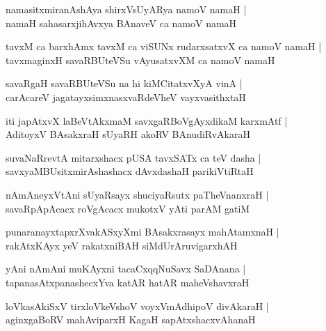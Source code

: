 \documentclass[twoside,12pt,openright]{book}
\newcounter{shloka}[chapter]
\begin{document}
\begin{shloka}%
namasitxmiranAshAya shirxVsUyARya namoV namaH |\\
namaH sahasarxjihAvxya BAnaveV ca namoV namaH 
\end{shloka}

\begin{shloka}%
tavxM ca barxhAmx tavxM ca viSUNx rudarxsatxvX ca namoV namaH |\\
tavxmaginxH savaRBUteVSu vAyusatxvXM ca namoV namaH 
\end{shloka}

\begin{shloka}%
savaRgaH savaRBUteVSu na hi kiMCitatxvXyA vinA |\\
carAcareV jagatayxsimxnasxvaRdeVheV vayxvasithxtaH 
\end{shloka}

\begin{shloka}%
iti japAtxvX laBeVtAkxmaM savxgaRBoVgAyxdikaM karxmAtf |\\
AditoyxV BAsakxraH sUyaRH akoRV BAnudiRvAkaraH 
\end{shloka}

\begin{shloka}%
suvaNaRrevtA mitarxshacx pUSA tavxSATx ca teV dasha |\\
savxyaMBUsitxmirAshashacx dAvxdashaH parikiVtiRtaH 
\end{shloka}

\begin{shloka}%
nAmAneyxVtAni sUyaRsayx shuciyaRsutx paTheVnanxraH |\\
savaRpApAcacx roVgAcacx mukotxV yAti parAM gatiM 
\end{shloka}

\begin{shloka}%
punaranayxtapxrXvakASxyXmi BAsakxrasayx mahAtamxnaH |\\
rakAtxKAyx yeV rakatxniBAH siMdUrAruvigarxhAH 
\end{shloka}

\begin{shloka}%
yAni nAmAni muKAyxni tacaCxqqNuSavx SaDAnana |\\
tapanasAtxpanashecxYva katAR hatAR maheVshavxraH 
\end{shloka}

\begin{shloka}%
loVkasAkiSxV tirxloVkeVshoV voyxVmAdhipoV divAkaraH |\\
aginxgaBoRV mahAviparxH KagaH sapAtxshacxvAhanaH
\end{shloka}
\end{document}

